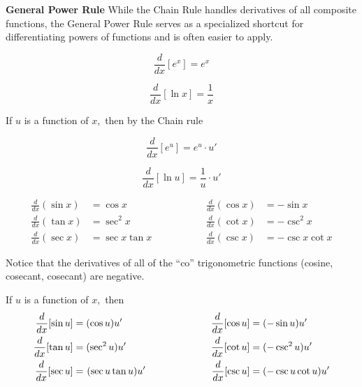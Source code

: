 \documentclass{ximera}
\begin{document}
\begin{remark}
\textcolor{orange!80!black}{\textbf{General Power Rule}}
While the Chain Rule handles derivatives of all composite functions, the General Power Rule serves as a specialized shortcut for differentiating powers of functions
and is often easier to apply.
\end{remark}


\begin{theorem}


\[ \frac{d}{dx} [e^x ] = e^x \]

\[ \frac{d}{dx} [\ln x ] = \frac{1}{x} \]

If $u$ is a function of $x,$ then by the Chain rule

\[ \frac{d}{dx} [e^u ] = e^u \cdot u' \]

\[ \frac{d}{dx} [\ln u ] = \frac{1}{u} \cdot u'  \]

\end{theorem}

\begin{theorem}

\[
\begin{aligned}
    \frac{d}{dx} (\sin x) &= \cos x  & \hspace{2cm} \frac{d}{dx} (\cos x) &= -\sin x \\
    \frac{d}{dx} (\tan x) &= \sec^2 x & \hspace{2cm} \frac{d}{dx} (\cot x) &= -\csc^2 x \\
    \frac{d}{dx} (\sec x) &= \sec x \tan x & \hspace{2cm} \frac{d}{dx} (\csc x) &= -\csc x \cot x
\end{aligned}
\]

\end{theorem}

\begin{remark}
    Notice that the derivatives of all of the ``co'' trigonometric functions (cosine, cosecant, cosecant) are negative.  
\end{remark}

\begin{theorem}

If $u$ is a function of $x,$ then
\[
\begin{aligned}
    \frac{d}{dx}[\sin u] &= (\cos u) u'  & \hspace{2cm} \frac{d}{dx}[\cos u] &= (-\sin u) u' \\
    \frac{d}{dx}[\tan u] &= (\sec^2 u) u' & \hspace{2cm} \frac{d}{dx}[\cot u] &= (-\csc^2 u) u' \\
    \frac{d}{dx}[\sec u] &= \hspace{0.01in} (\sec u \tan u) u' & \hspace{2cm} \frac{d}{dx}[ \csc u] &=  (-\csc u \cot u) u' \\
\end{aligned}
\]
\end{theorem}
\end{document}
